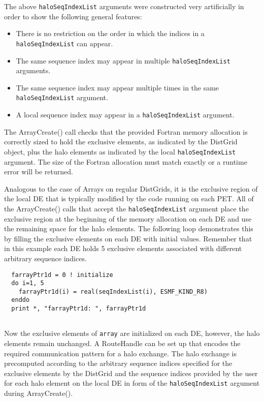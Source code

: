    The above {\tt haloSeqIndexList} arguments were constructed very artificially
   in order to show the following general features:
   \begin{itemize}
   \item There is no restriction on the order in which the indices in a
   {\tt haloSeqIndexList} can appear.
   \item The same sequence index may appear in multiple {\tt haloSeqIndexList}
   arguments.
   \item The same sequence index may appear multiple times in the same 
   {\tt haloSeqIndexList} argument.
   \item A local sequence index may appear in a {\tt haloSeqIndexList} argument.
   \end{itemize}
  
   The ArrayCreate() call checks that the provided Fortran memory allocation
   is correctly sized to hold the exclusive elements, as indicated by the
   DistGrid object, plus the halo elements as indicated by the local
   {\tt haloSeqIndexList} argument. The size of the Fortran allocation must
   match exactly or a runtime error will be returned.
  
   Analogous to the case of Arrays on regular DistGrids, it is the exclusive
   region of the local DE that is typically modified by the code running on 
   each PET. All of the ArrayCreate() calls that accept the
   {\tt haloSeqIndexList} argument place the exclusive region at the beginning
   of the memory allocation on each DE and use the remaining space for the halo
   elements. The following loop demonstrates this by filling the exclusive 
   elements on each DE with initial values. Remember that in this example each 
   DE holds 5 exclusive elements associated with different arbitrary sequence 
   indices. 

 \begin{verbatim}
  farrayPtr1d = 0 ! initialize
  do i=1, 5
    farrayPtr1d(i) = real(seqIndexList(i), ESMF_KIND_R8)
  enddo
  print *, "farrayPtr1d: ", farrayPtr1d
 
\end{verbatim}
 

   Now the exclusive elements of {\tt array} are initialized on each DE, however,
   the halo elements remain unchanged. A RouteHandle can be set up that encodes
   the required communication pattern for a halo exchange. The halo exchange
   is precomputed according to the arbitrary sequence indices specified for the
   exclusive elements by the DistGrid and the sequence indices provided by the 
   user for each halo element on the local DE in form of the 
   {\tt haloSeqIndexList} argument during ArrayCreate(). 
    
